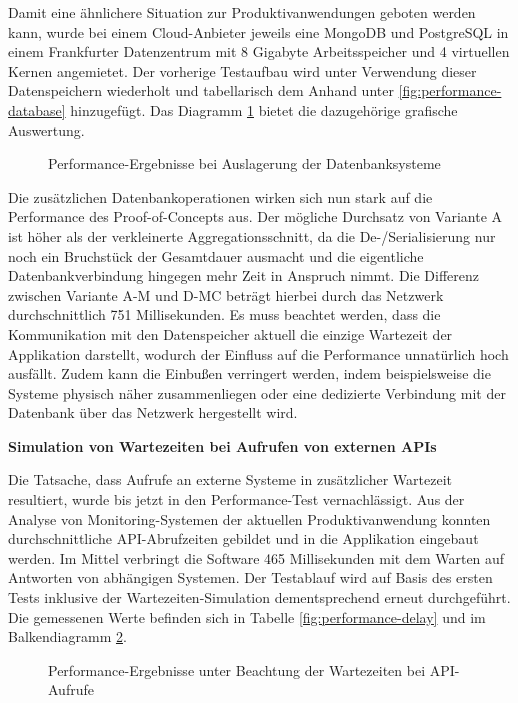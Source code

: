 Damit eine ähnlichere Situation zur Produktivanwendungen geboten werden kann, wurde bei einem Cloud-Anbieter jeweils eine MongoDB und PostgreSQL in einem Frankfurter Datenzentrum mit 8 Gigabyte Arbeitsspeicher und 4 virtuellen Kernen angemietet. Der vorherige Testaufbau wird unter Verwendung dieser Datenspeichern wiederholt und tabellarisch dem Anhand unter \ref{fig:performance-database} hinzugefügt. Das Diagramm \ref{fig:PerformanceDatabase} bietet die dazugehörige grafische Auswertung.

\begin{figure}[htpb]
	\centering
	\footnotesize
	
	\caption{Performance-Ergebnisse bei Auslagerung der Datenbanksysteme}
	\label{fig:PerformanceDatabase}
\end{figure}

Die zusätzlichen Datenbankoperationen wirken sich nun stark auf die Performance des Proof-of-Concepts aus. Der mögliche Durchsatz von Variante A ist höher als der verkleinerte Aggregationsschnitt, da die De-/Serialisierung nur noch ein Bruchstück der Gesamtdauer ausmacht und die eigentliche Datenbankverbindung hingegen mehr Zeit in Anspruch nimmt. Die Differenz zwischen Variante A-M und D-MC beträgt hierbei durch das Netzwerk durchschnittlich 751 Millisekunden. Es muss beachtet werden, dass die Kommunikation mit den Datenspeicher aktuell die einzige Wartezeit der Applikation darstellt, wodurch der Einfluss auf die Performance unnatürlich hoch ausfällt. Zudem kann die Einbußen verringert werden, indem beispielsweise die Systeme physisch näher zusammenliegen oder eine dedizierte Verbindung mit der Datenbank über das Netzwerk hergestellt wird.


\textbf{Simulation von Wartezeiten bei Aufrufen von externen APIs}

Die Tatsache, dass Aufrufe an externe Systeme in zusätzlicher Wartezeit resultiert, wurde bis jetzt in den Performance-Test vernachlässigt. Aus der Analyse von Monitoring-Systemen der aktuellen Produktivanwendung konnten durchschnittliche API-Abrufzeiten gebildet und in die Applikation eingebaut werden. Im Mittel verbringt die Software 465 Millisekunden mit dem Warten auf Antworten von abhängigen Systemen. Der Testablauf wird auf Basis des ersten Tests inklusive der Wartezeiten-Simulation dementsprechend erneut durchgeführt. Die gemessenen Werte befinden sich in Tabelle \ref{fig:performance-delay} und im Balkendiagramm \ref{fig:PerformanceDelay}. 

\begin{figure}[htpb]
	\centering
	\footnotesize
	
	\caption{Performance-Ergebnisse unter Beachtung der Wartezeiten bei API-Aufrufe}
	\label{fig:PerformanceDelay}
\end{figure}

